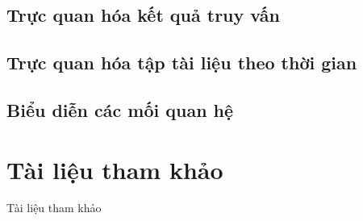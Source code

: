 \documentclass[10pt]{beamer}
\theoremstyle{remark}
\theoremstyle{definition}
\begin{document}
\subsection{Trực quan hóa kết quả truy vấn}

\subsection{Trực quan hóa tập tài liệu theo thời gian}

\subsection{Biểu diễn các mối quan hệ}

\section{Tài liệu tham khảo}
\begin{frame}[allowframebreaks]{Tài liệu tham khảo}
    \printbibliography
\end{frame}
\end{document}
